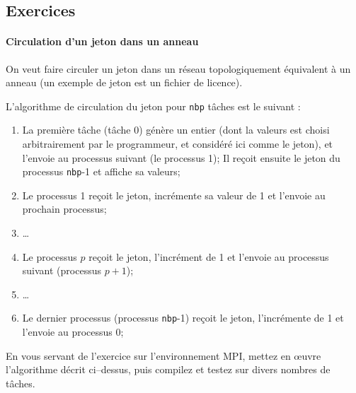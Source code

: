 \documentclass[11pt,a4paper]{article}
\begin{document}
\subsection{Exercices}

\paragraph{Circulation d'un jeton dans un anneau}

On veut faire circuler un jeton dans un réseau topologiquement équivalent
à un anneau (un exemple de jeton est un fichier de licence).

L'algorithme de circulation du jeton pour \texttt{nbp} tâches est le suivant :
\begin{enumerate}
\item La première tâche (tâche 0) génère un entier (dont la valeurs est choisi arbitrairement par le
  programmeur, et considéré ici comme le jeton), et l'envoie au processus suivant (le processus 1);
  Il reçoit ensuite le jeton du processus \texttt{nbp}-1 et affiche sa valeurs;
\item Le processus 1 reçoit le jeton, incrémente sa valeur de 1 et l'envoie au prochain processus;
\item \ldots
\item Le processus $p$ reçoit le jeton, l'incrément de 1 et l'envoie au processus suivant
(processus $p+1$);
\item \ldots
\item Le dernier processus (processus \texttt{nbp}-1) reçoit le jeton, l'incrémente de 1 et
  l'envoie au processus 0;
\end{enumerate}

En vous servant de l'exercice sur l'environnement MPI, mettez en {\oe}uvre l'algorithme décrit ci--dessus, puis
compilez et testez sur divers nombres de tâches.

\end{document}
